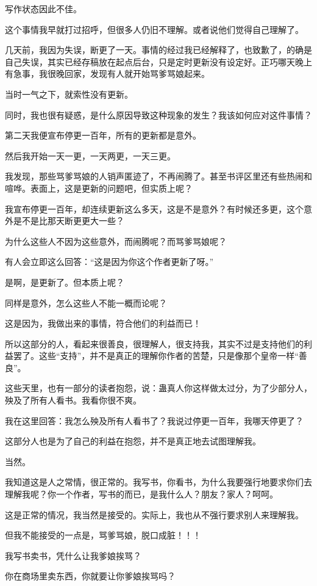 \begin{this_body}
写作状态因此不佳。

这个事情我早就打过招呼，但很多人仍旧不理解。或者说他们觉得自己理解了。

几天前，我因为失误，断更了一天。事情的经过我已经解释了，也致歉了，的确是自己失误，其实已经存稿放在起点后台，只是定时更新没有设定好。正巧哪天晚上有急事，我很晚回家，发现有人就开始骂爹骂娘起来。

当时一气之下，就索性没有更新。

同时，我也很有疑惑，是什么原因导致这种现象的发生？我该如何应对这件事情？

第二天我便宣布停更一百年，所有的更新都是意外。

然后我开始一天一更，一天两更，一天三更。

我发现，那些骂爹骂娘的人销声匿迹了，不再闹腾了。甚至书评区里还有些热闹和喧哗。表面上，这是更新的问题吧，但实质上呢？

我宣布停更一百年，却连续更新这么多天，这是不是意外？有时候还多更，这个意外是不是比那天断更更大一些？

为什么这些人不因为这些意外，而闹腾呢？而骂爹骂娘呢？

有人会立即这么回答：“这是因为你这个作者更新了呀。”

是啊，是更新了。但本质上呢？

同样是意外，怎么这些人不能一概而论呢？

这是因为，我做出来的事情，符合他们的利益而已！

所以这部分的人，看起来很善良，很理解人，很支持我，其实不过是支持他们的利益罢了。这些“支持”，并不是真正的理解你作者的苦楚，只是像那个皇帝一样“善良”。

这些天里，也有一部分的读者抱怨，说：蛊真人你这样做太过分，为了少部分人，殃及了所有人看书。我看你很不爽。

我在这里回答：我怎么殃及所有人看书了？我说过停更一百年，我哪天停更了？

这部分人也是为了自己的利益在抱怨，并不是真正地去试图理解我。

当然。

我知道这是人之常情，很正常的。我写书，你看书，为什么我要强行地要求你们去理解我呢？你一个作者，写书的而已，是我什么人？朋友？家人？呵呵。

这是正常的情况，我当然是接受的。实际上，我也从不强行要求别人来理解我。

但我不能接受的一点是，骂爹骂娘，脱口成脏！！！

我写书卖书，凭什么让我爹娘挨骂？

你在商场里卖东西，你就要让你爹娘挨骂吗？


\end{this_body}
